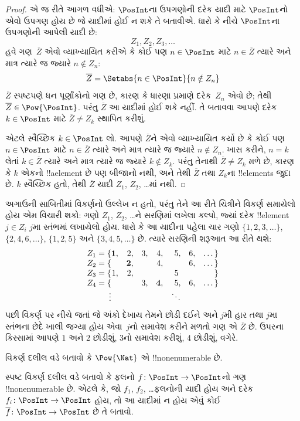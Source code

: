 \documentclass[../../../include/open-logic-section]{subfiles}
\begin{document}
\begin{proof}
એ જ રીતે આગળ વધીએ: $\PosInt$ના ઉપગણોની દરેક યાદી માટે
$\PosInt$નો એવો ઉપગણ હોય છે જે યાદીમાં હોઈ ન શકે તે બતાવીએ.
ધારો કે નીચે $\PosInt$ના ઉપગણોની આપેલી યાદી છે:
\[
Z_{1}, Z_{2}, Z_{3}, \dots
\]
હવે ગણ~$\overline{Z}$ એવો વ્યાખ્યાયિત કરીએ કે કોઈ પણ
$n \in \PosInt$ માટે $n \in \overline{Z}$ ત્યારે અને માત્ર
ત્યારે જ જ્યારે $n \notin Z_{n}$:
\[
\overline{Z} = \Setabs{n \in \PosInt}{n \notin Z_n}
\]
$\overline{Z}$ સ્પષ્ટપણે ધન પૂર્ણાંકોનો ગણ છે, કારણ કે ધારણા
પ્રમાણે દરેક~$Z_n$ એવો છે; તેથી $\overline{Z} \in
\Pow{\PosInt}$. પરંતુ $\overline{Z}$ આ યાદીમાં હોઈ શકે નહીં.
તે બતાવવા આપણે દરેક $k \in \PosInt$ માટે $\overline{Z} \neq
Z_k$ સ્થાપિત કરીશું.

એટલે સ્વૈચ્છિક $k \in \PosInt$ લો. આપણે $\overline{Z}$ને એવો
વ્યાખ્યાયિત કર્યો છે કે કોઈ પણ $n \in \PosInt$ માટે
$n \in \overline{Z}$ ત્યારે અને માત્ર ત્યારે જ જ્યારે
$n \notin Z_n$. ખાસ કરીને, $n=k$ લેતાં
$k \in \overline{Z}$ ત્યારે અને માત્ર ત્યારે જ જ્યારે
$k \notin Z_k$. પરંતુ તેનાથી $\overline{Z} \neq Z_k$ મળે છે,
કારણ કે $k$ એકનો !!a{element} છે પણ બીજાનો નથી, અને તેથી
$\overline{Z}$ તથા $Z_k$ના !!{element}s જુદા છે. $k$ સ્વૈચ્છિક
હતો, તેથી $\overline{Z}$ યાદી $Z_1$, $Z_2$, \dots{}માં નથી.
\end{proof}

\begin{explain}
અગાઉની સાબિતીમાં વિકર્ણનો ઉલ્લેખ ન હતો, પરંતુ તેને આ રીતે
ચિત્રીને વિકર્ણ સમાયેલો હોય એમ વિચારી શકો: ગણો $Z_1$, $Z_2$,
\dots{}ને સરણિમાં લખેલા કલ્પો, જ્યાં દરેક !!{element}~$j \in Z_i$
$j$મા સ્તંભમાં લખાયેલો હોય. ધારો કે આ યાદીના પહેલા ચાર ગણો
$\{1,2,3,\dots\}$, $\{2, 4, 6, \dots\}$, $\{1,2,5\}$ અને
$\{3,4,5,\dots\}$ છે. ત્યારે સરણિની શરૂઆત આ રીતે થશે:
\[
\begin{array}{r@{}rrrrrrr}
  Z_1 = \{ & \mathbf{1}, & 2, & 3, & 4, & 5, & 6, & \dots\}\\
  Z_2 = \{ &  & \mathbf{2}, &  & 4, &  & 6, & \dots\}\\
  Z_3 = \{ & 1, & 2, &  &  & 5\phantom{,} &  & \}\\
  Z_4 = \{ &  &  & 3, & \mathbf{4}, & 5, & 6, & \dots\}\\
  \vdots & & & & & \ddots
\end{array}
\]
પછી વિકર્ણ પર નીચે જતાં જે અંકો દેખાય તેમને છોડી દઈને અને
$j$મી હાર તથા $j$મા સ્તંભના છેદે ખાલી જગ્યા હોય એવા~$j$નો
સમાવેશ કરીને મળતો ગણ એ $\overline{Z}$ છે. ઉપરના કિસ્સામાં આપણે
$1$ અને $2$ છોડીશું, $3$નો સમાવેશ કરીશું, $4$ છોડીશું, વગેરે.
\end{explain}

\begin{prob}
વિકર્ણ દલીલ વડે બતાવો કે $\Pow{\Nat}$ એ !!{nonenumerable} છે.
\end{prob}

\begin{prob}\label{sfr:siz:nen:prob:f-posint}
સ્પષ્ટ વિકર્ણ દલીલ વડે બતાવો કે ફલનો
$f \colon \PosInt \to \PosInt$નો ગણ !!{nonenumerable} છે.
એટલે કે, જો $f_1$, $f_2$, \dots ફલનોની યાદી હોય અને દરેક
$f_i\colon \PosInt \to \PosInt$ હોય, તો આ યાદીમાં ન હોય એવું
કોઈ $\overline{f}\colon \PosInt \to \PosInt$ છે તે બતાવો.
\end{prob}
\end{document}
